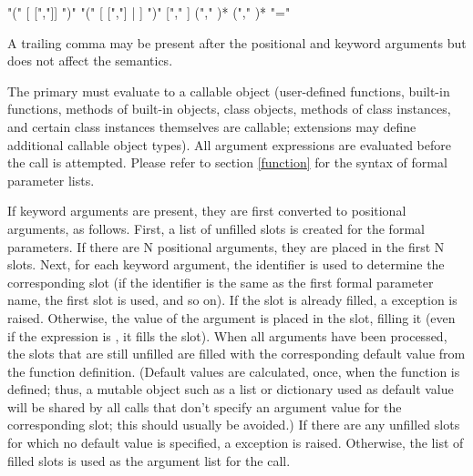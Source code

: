 \begin{productionlist}
             { "(" [ [","]] ")"}
             { "(" [ [","] |
	        ] ")"}                                                   
             { ["," ]}
             { ("," )*}
             { ("," )*}
             { "=" }
\end{productionlist}

A trailing comma may be present after the positional and keyword
arguments but does not affect the semantics.

The primary must evaluate to a callable object (user-defined
functions, built-in functions, methods of built-in objects, class
objects, methods of class instances, and certain class instances
themselves are callable; extensions may define additional callable
object types).  All argument expressions are evaluated before the call
is attempted.  Please refer to section \ref{function} for the syntax
of formal parameter lists.

If keyword arguments are present, they are first converted to
positional arguments, as follows.  First, a list of unfilled slots is
created for the formal parameters.  If there are N positional
arguments, they are placed in the first N slots.  Next, for each
keyword argument, the identifier is used to determine the
corresponding slot (if the identifier is the same as the first formal
parameter name, the first slot is used, and so on).  If the slot is
already filled, a  exception is raised.
Otherwise, the value of the argument is placed in the slot, filling it
(even if the expression is , it fills the slot).  When all
arguments have been processed, the slots that are still unfilled are
filled with the corresponding default value from the function
definition.  (Default values are calculated, once, when the function
is defined; thus, a mutable object such as a list or dictionary used
as default value will be shared by all calls that don't specify an
argument value for the corresponding slot; this should usually be
avoided.)  If there are any unfilled slots for which no default value
is specified, a  exception is raised.  Otherwise,
the list of filled slots is used as the argument list for the call.

